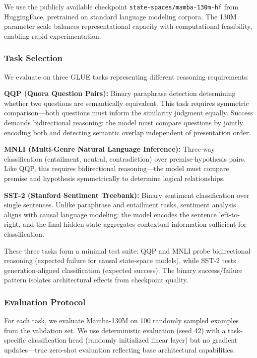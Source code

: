 We use the publicly available checkpoint \texttt{state-spaces/mamba-130m-hf} from HuggingFace, pretrained on standard language modeling corpora. The 130M parameter scale balances representational capacity with computational feasibility, enabling rapid experimentation.

\subsubsection{Task Selection}

We evaluate on three GLUE tasks representing different reasoning requirements:

\textbf{QQP (Quora Question Pairs):} Binary paraphrase detection determining whether two questions are semantically equivalent. This task requires symmetric comparison---both questions must inform the similarity judgment equally. Success demands bidirectional reasoning: the model must compare questions by jointly encoding both and detecting semantic overlap independent of presentation order.

\textbf{MNLI (Multi-Genre Natural Language Inference):} Three-way classification (entailment, neutral, contradiction) over premise-hypothesis pairs. Like QQP, this requires bidirectional reasoning---the model must compare premise and hypothesis symmetrically to determine logical relationships.

\textbf{SST-2 (Stanford Sentiment Treebank):} Binary sentiment classification over single sentences. Unlike paraphrase and entailment tasks, sentiment analysis aligns with causal language modeling: the model encodes the sentence left-to-right, and the final hidden state aggregates contextual information sufficient for classification.

These three tasks form a minimal test suite: QQP and MNLI probe bidirectional reasoning (expected failure for causal state-space models), while SST-2 tests generation-aligned classification (expected success). The binary success/failure pattern isolates architectural effects from checkpoint quality.

\subsubsection{Evaluation Protocol}

For each task, we evaluate Mamba-130M on 100 randomly sampled examples from the validation set. We use deterministic evaluation (seed 42) with a task-specific classification head (randomly initialized linear layer) but no gradient updates---true zero-shot evaluation reflecting base architectural capabilities.

